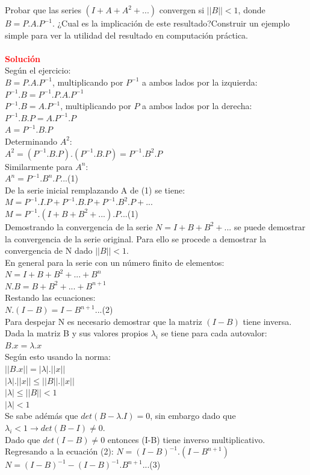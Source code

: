 \documentclass[12pt]{article}
\begin{document}
Probar que las series $(I+A+A^2+...)$ convergen si $||B|| < 1$, donde $B=P.A.P^{-1}$. ¿Cual es la implicación de este resultado?Construir un ejemplo simple para ver la utilidad del resultado en computación práctica.\\\\
\noindent \textcolor{red}{\bf Soluci\'on}\\
Según el ejercicio:\\
$B=P.A.P^{-1}$, multiplicando por $P^{-1}$ a ambos lados por la izquierda:\\
$P^{-1}.B=P^{-1}.P.A.P^{-1}$\\
$P^{-1}.B=A.P^{-1}$, multiplicando por $P$ a ambos lados por la derecha:\\
$P^{-1}.B.P=A.P^{-1}.P$\\
$A=P^{-1}.B.P$\\
 Determinando $A^2$:\\
$A^2=(P^{-1}.B.P).(P^{-1}.B.P)=P^{-1}.B^2.P$\\
Similarmente para $A^n$:\\
$A^n=P^{-1}.B^n.P$\quad...(1)\\

De la serie inicial remplazando A de (1) se tiene:\\
$M=P^{-1}.I.P+P^{-1}.B.P+P^{-1}.B^2.P+...$\\
$M=P^{-1}.(I+B+B^2+...).P$\quad...(1)\\

Demostrando la convergencia de la serie $N=I+B+B^2+...$ se puede demostrar la convergencia de la serie original. Para ello se procede a demostrar la convergencia de N dado $||B||<1$.\\

En general para la serie con un número finito de elementos:\\
$N=I+B+B^2+...+B^n$\\
$N.B=B+B^2+...+B^{n+1}$\\
Restando las ecuaciones:\\
$N.(I-B)=I-B^{n+1}$...(2)\\
Para despejar N es necesario demostrar que la matriz $(I-B)$ tiene inversa.\\

Dada la matriz B y sus valores propios $\lambda_i$  se tiene para cada autovalor:\\
$B.x=\lambda.x$\\
Según esto usando la norma:\\
$||B.x||=|\lambda|.||x||$\\
$|\lambda|.||x||\leq ||B||.||x||$\\
$|\lambda| \leq ||B|| < 1$\\
$|\lambda| < 1$\\
Se sabe adémás que $det(B-\lambda.I)=0$, sin embargo dado que $\lambda_i < 1 \to det(B-I) \neq 0$.\\
Dado que $det(I-B) \neq 0$ entonces (I-B) tiene inverso multiplicativo.\\
Regresando a la ecuación (2):
$N=(I-B)^{-1}.(I-B^{n+1})$\\
$N=(I-B)^{-1}-(I-B)^{-1}.B^{n+1}$\quad...(3)\\
\end{document}
